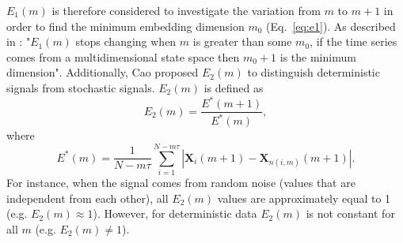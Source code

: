 \documentclass[fleqn,10pt]{wlscirep}
\begin{document}
$E_1(m)$ is therefore considered to investigate the variation from $m$ to $m+1$ in order to find the minimum embedding dimension $m_0$ (Eq.~\ref{eq:e1}).
As described in \cite{Cao1997}: "$E_1(m)$ stops changing when $m$ is greater than some $m_0$, if the time series comes from a multidimensional state space then $m_0 + 1$ is the minimum dimension".
Additionally, Cao proposed $E_2(m)$ to distinguish deterministic signals from stochastic signals. $E_2(m)$ is defined as
\begin{equation}\label{eq:e2}
E_2(m) = \frac{ E^* (m+1) } { E^*(m)},
\end{equation}
where
\begin{equation}\label{eq:ee}
E^*(m) = \frac{1}{N-m\tau} \sum_{i=1}^{N-m\tau}
|  \boldsymbol{X}_i(m+1) - \boldsymbol{X}_{n(i,m)}(m+1) |.
\end{equation}
For instance, when the signal comes from random noise (values that are independent from each other), all $E_2(m)$ values are approximately equal to 1 (e.g. $E_2(m) \approx 1$). However, for deterministic data $E_2(m)$ is not constant for all $m$ (e.g. $E_2(m) \neq 1$).
\end{document}
